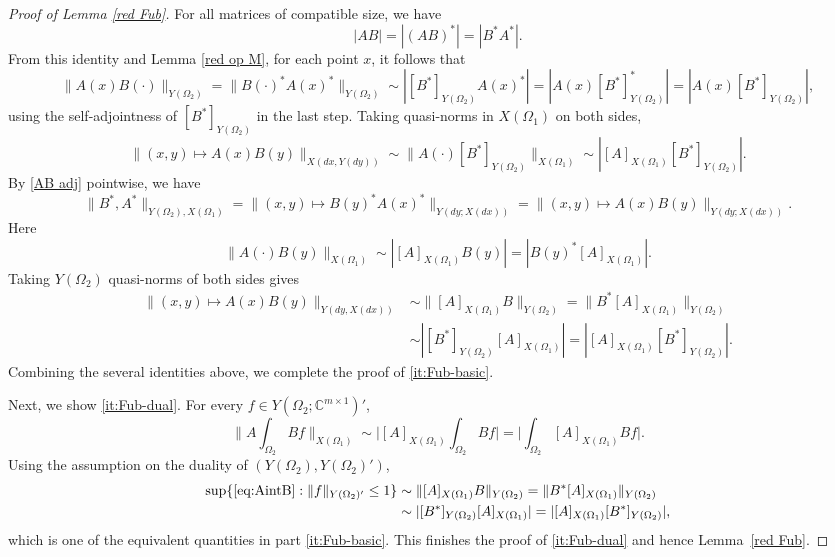 \documentclass[11pt, reqno]{amsart}
\theoremstyle{definition}
\theoremstyle{remark}
\numberwithin{equation}{section}
\newcommand{\abs}[1]{|#1|}
\newcommand{\Babs}[1]{\Big|#1\Big|}
\newcommand{\Norm}[2]{\|#1\|_{#2}}
\newcommand{\BNorm}[2]{\Big\|#1\Big\|_{#2}}
\begin{document}
\begin{proof}[Proof of Lemma \ref{red Fub}]
For all matrices of compatible size, we have
\begin{equation}\label{AB adj}
|AB|=|(AB)^*|=|B^*A^*|.
\end{equation}
From this identity and Lemma \ref{red op M}, for each point $x$, it follows that
\begin{equation*}
\Norm{A(x)B(\cdot)}{Y(\Omega_2)}
=\Norm{ B(\cdot)^*A(x)^*}{Y(\Omega_2)}
\sim\abs{[B^*]_{Y(\Omega_2)}A(x)^*}
=\abs{A(x)[B^*]_{Y(\Omega_2)}^*}
=\abs{A(x)[B^*]_{Y(\Omega_2)}},
\end{equation*}
using the self-adjointness of $[B^*]_{Y(\Omega_2)}$ in the last step.
Taking quasi-norms in $X(\Omega_1)$ on both sides,
\begin{equation*}
\Norm{(x,y)\mapsto A(x)B(y)}{X(dx,Y(dy))}
\sim \Norm{A(\cdot)[B^*]_{Y(\Omega_2)} }{X(\Omega_1)}
\sim \abs{[A]_{X(\Omega_1)}[B^*]_{Y(\Omega_2)}}.
\end{equation*}
By \eqref{AB adj} pointwise, we have
\begin{equation*}
\Norm{B^*,A^*}{Y(\Omega_2),X(\Omega_1)}=\Norm{(x,y)\mapsto B(y)^*A(x)^*}{Y(dy;X(dx))}
=\Norm{(x,y)\mapsto A(x)B(y)}{Y(dy;X(dx))}.
\end{equation*}
Here
\begin{equation*}
\Norm{ A(\cdot)B(y)}{X(\Omega_1)}
\sim\abs{[A]_{X(\Omega_1)} B(y)}
=\abs{B(y)^*[A]_{X(\Omega_1)}}.
\end{equation*}
Taking $Y(\Omega_2)$ quasi-norms of both sides gives
\begin{align*}
\Norm{(x,y)\mapsto A(x)B(y)}{Y(dy,X(dx))}
&\sim\Norm{[A]_{X(\Omega_1)} B}{Y(\Omega_2)}
=\Norm{B^*[A]_{X(\Omega_1)}}{Y(\Omega_2)} \\
&\sim\abs{[B^*]_{Y(\Omega_2)}[A]_{X(\Omega_1)}}
=\abs{[A]_{X(\Omega_1)}[B^*]_{Y(\Omega_2)}}.
\end{align*}
Combining the several identities above, we complete the proof of \eqref{it:Fub-basic}.

Next, we show \eqref{it:Fub-dual}.
For every $f\in Y(\Omega_2;\mathbb C^{m\times 1})'$,
\begin{equation}\label{eq:AintB}
\BNorm{ A\int_{\Omega_2} B f}{X(\Omega_1)}
\sim\Babs{[A]_{X(\Omega_1)}\int_{\Omega_2}B f}
=\Babs{\int_{\Omega_2}[A]_{X(\Omega_1)} B f}.
\end{equation}
Using the assumption on the duality of $(Y(\Omega_2),Y(\Omega_2)')$,
\begin{equation*}
\begin{split}
 \sup\{\eqref{eq:AintB}:\Norm{f}{Y(\Omega_2)'}\leq 1\}
&\sim\Norm{[A]_{X(\Omega_1)} B}{Y(\Omega_2)}=\Norm{B^*[A]_{X(\Omega_1)}}{Y(\Omega_2)} \\
&\sim\abs{[B^*]_{Y(\Omega_2)}[A]_{X(\Omega_1)}}
=\abs{[A]_{X(\Omega_1)}[B^*]_{Y(\Omega_2)}},
\end{split}
\end{equation*}
which is one of the equivalent quantities in part \eqref{it:Fub-basic}.
This finishes the proof of \eqref{it:Fub-dual} and hence Lemma~\ref{red Fub}.
\end{proof}
\end{document}
